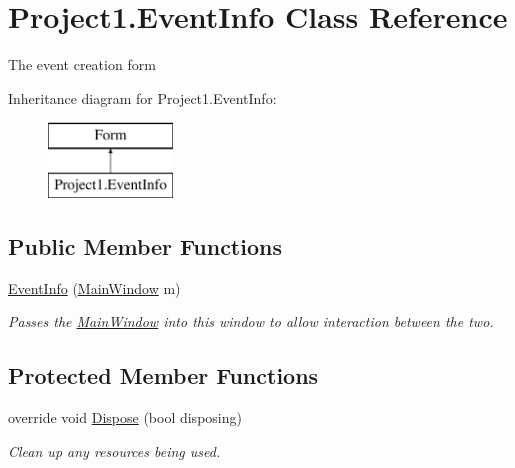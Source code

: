 \hypertarget{class_project1_1_1_event_info}{}\section{Project1.\+Event\+Info Class Reference}
\label{class_project1_1_1_event_info}


The event creation form  


Inheritance diagram for Project1.\+Event\+Info\+:\begin{figure}[H]
\begin{center}
\leavevmode
\includegraphics[height=2.000000cm]{class_project1_1_1_event_info}
\end{center}
\end{figure}
\subsection*{Public Member Functions}
\begin{DoxyCompactItemize}
\item 
\hyperlink{class_project1_1_1_event_info_a9bf24095fee3d3b879e61fa990e8209c}{Event\+Info} (\hyperlink{class_project1_1_1_main_window}{Main\+Window} m)
\begin{DoxyCompactList}\small\item\em Passes the \hyperlink{class_project1_1_1_main_window}{Main\+Window} into this window to allow interaction between the two. \end{DoxyCompactList}\end{DoxyCompactItemize}
\subsection*{Protected Member Functions}
\begin{DoxyCompactItemize}
\item 
override void \hyperlink{class_project1_1_1_event_info_aa54f1ee810e1b9ea20b3bb9ed76be80b}{Dispose} (bool disposing)
\begin{DoxyCompactList}\small\item\em Clean up any resources being used. \end{DoxyCompactList}\end{DoxyCompactItemize}


